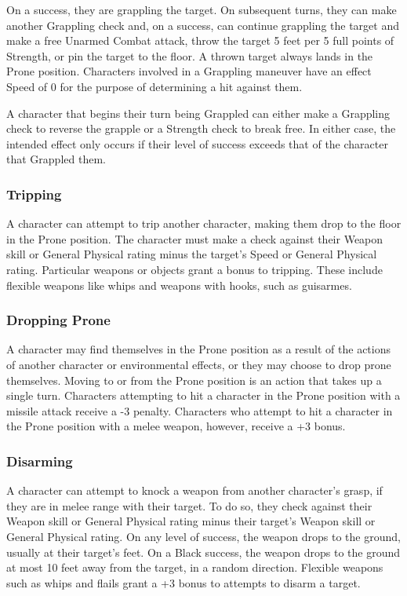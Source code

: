 \documentclass[oneside]{book}
\begin{document}
\begin{multicols}{2}
On a success, they are grappling the target. On subsequent turns, they can make another Grappling check and, on a success, can continue grappling the target and make a free Unarmed Combat attack, throw the target 5 feet per 5 full points of Strength, or pin the target to the floor. A thrown target always lands in the Prone position. Characters involved in a Grappling maneuver have an effect Speed of 0 for the purpose of determining a hit against them.

A character that begins their turn being Grappled can either make a Grappling check to reverse the grapple or a Strength check to break free. In either case, the intended effect only occurs if their level of success exceeds that of the character that Grappled them. 


\subsubsection{Tripping}
A character can attempt to trip another character, making them drop to the floor in the Prone position. The character must make a check against their Weapon skill or General Physical rating minus the target's Speed or General Physical rating. Particular weapons or objects grant a bonus to tripping. These include flexible weapons like whips and weapons with hooks, such as guisarmes.

\subsubsection{Dropping Prone}
A character may find themselves in the Prone position as a result of the actions of another character or environmental effects, or they may choose to drop prone themselves. Moving to or from the Prone position is an action that takes up a single turn. Characters attempting to hit a character in the Prone position with a missile attack receive a -3 penalty. Characters who attempt to hit a character in the Prone position with a melee weapon, however, receive a +3 bonus. 

\subsubsection{Disarming}
A character can attempt to knock a weapon from another character's grasp, if they are in melee range with their target. To do so, they check against their Weapon skill or General Physical rating minus their target's Weapon skill or General Physical rating. On any level of success, the weapon drops to the ground, usually at their target's feet. On a Black success, the weapon drops to the ground at most 10 feet away from the target, in a random direction. Flexible weapons such as whips and flails grant a +3 bonus to attempts to disarm a target.


\end{multicols}
\end{document}
